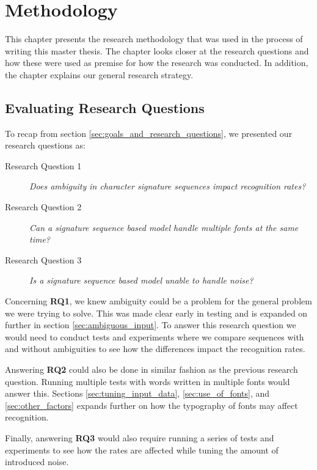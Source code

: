
\chapter{Methodology}
\label{ch:methodology}
This chapter presents the research methodology that was used in the process of writing this master thesis. The chapter looks closer at the research questions and how these were used as premise for how the research was conducted. In addition, the chapter explains our general research strategy.


\section{Evaluating Research Questions}
\label{sec:research_questions_and_approach}
To recap from section \ref{sec:goals_and_research_questions}, we presented our research questions as:

\begin{description}
    \item[Research Question 1]{\textit{Does ambiguity in character signature sequences impact recognition rates?}}
    \item[Research Question 2]{\textit{Can a signature sequence based model handle multiple fonts at the same time?}}
    \item[Research Question 3]{\textit{Is a signature sequence based model unable to handle noise?}}
\end{description}

Concerning \textbf{RQ1}, we knew ambiguity could be a problem for the general problem we were trying to solve. This was made clear early in testing and is expanded on further in section \ref{sec:ambiguous_input}. To answer this research question we would need to conduct tests and experiments where we compare sequences with and without ambiguities to see how the differences impact the recognition rates.

Answering \textbf{RQ2} could also be done in similar fashion as the previous research question. Running multiple tests with words written in multiple fonts would answer this. Sections \ref{sec:tuning_input_data}, \ref{sec:use_of_fonts}, and \ref{sec:other_factors} expands further on how the typography of fonts may affect recognition.

Finally, answering \textbf{RQ3} would also require running a series of tests and experiments to see how the rates are affected while tuning the amount of introduced noise.

